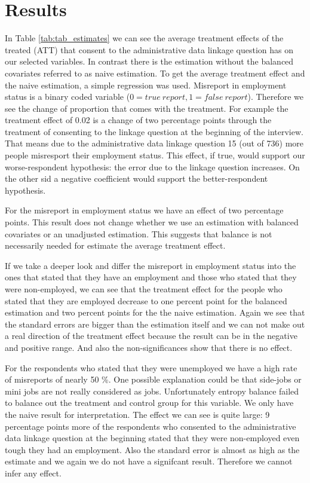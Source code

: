 

\section{Results}

In Table \ref{tab:tab_estimates} we can see the average treatment effects of the treated (ATT) that consent to the administrative data linkage question has on our selected variables. In contrast there is the estimation without the balanced covariates referred to as naive estimation. To get the average treatment effect and the naive estimation, a simple regression was used. Misreport in employment status is a binary coded variable (\(0=true\ report, 1=false \ report\)). Therefore we see the change of proportion that comes with the treatment. For example the treatment effect of 0.02 is a change of two percentage points through the treatment of consenting to the linkage question at the beginning of the interview. That means due to the administrative data linkage question 15 (out of 736) more people misresport their employment status. This effect, if true, would support our worse-respondent hypothesis: the error due to the linkage question increases. On the other sid a negative coefficient would support the better-respondent hypothesis.

For the misreport in employment status we have an effect of two percentage points. This result does not change whether we use an estimation with balanced covariates or an unadjusted estimation. This suggests that balance is not necessarily needed for estimate the average treatment effect.

If we take a deeper look and differ the misreport in employment status into the ones that stated that they have an employment and those who stated that they were non-employed, we can see that the treatment effect for the people who stated that they are employed decrease to one percent point for the balanced estimation and two percent points for the the naive estimation. Again we see that the standard errors are bigger than the estimation itself and we can not make out a real direction of the treatment effect because the result can be in the negative and positive range. And also the non-significances show that there is no effect.

For the respondents who stated that they were unemployed we have a high rate of misreports of nearly 50 \%. One possible explanation could be that side-jobs or mini jobs are not really considered as jobs. Unfortunately entropy balance failed to balance out the treatment and control group for this variable. We only have the naive result for interpretation. The effect we can see is quite large: 9 percentage points more of the respondents who consented to the administrative data linkage question at the beginning stated that they were non-employed even tough they had an employment. Also the standard error is almost as high as the estimate and we again we do not have a signifcant result. Therefore we cannot infer any effect.

